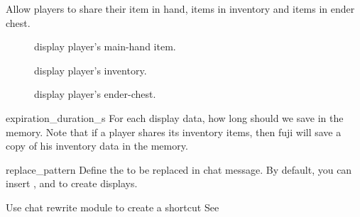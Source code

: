 Allow players to share their item in hand, items in inventory and items in ender chest.

\begin{description}
    \item [] display player's main-hand item.
    \item[] display player's inventory.
    \item[] display player's ender-chest.
\end{description}

\begin{Configuration}
    \item[expiration\_duration\_s]{
        For each display data, how long should we save in the memory.
        Note that if a player shares its inventory items, then fuji will save a copy of his inventory data in the memory.
    }

    \item[replace\_pattern] {
        Define the  to be replaced in chat message.
        By default, you can insert \str{[item]}, \str{[inv]} and \str{[ender]} to create displays.
    }

\end{Configuration}

\begin{example}{Use chat rewrite module to create a shortcut}
    See~
\end{example}